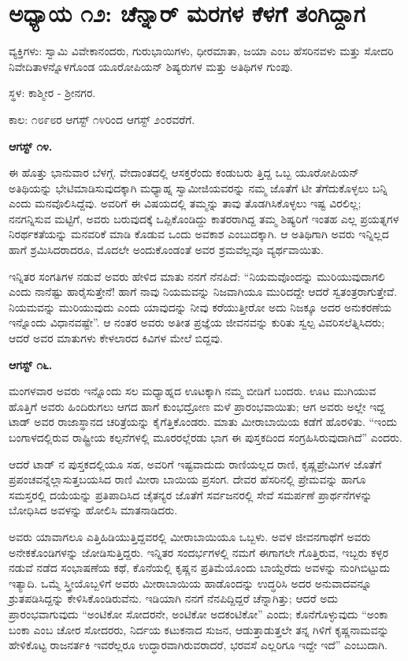 
\chapter{ಅಧ್ಯಾಯ ೧೨: ಚೆನ್ನಾರ್ ಮರಗಳ ಕೆಳಗೆ ತಂಗಿದ್ದಾಗ}

ವ್ಯಕ್ತಿಗಳು: ಸ್ವಾಮಿ ವಿವೇಕಾನಂದರು, ಗುರುಭಾಯಿಗಳು, ಧೀರಮಾತಾ, ಜಯಾ ಎಂಬ ಹೆಸರಿನವಳು ಮತ್ತು ಸೋದರಿ ನಿವೇದಿತಾಳನ್ನೊಳಗೊಂಡ ಯೂರೋಪಿಯನ್ ಶಿಷ್ಯರುಗಳ ಮತ್ತು ಅತಿಥಿಗಳ ಗುಂಪು.

ಸ್ಥಳ: ಕಾಶ್ಮೀರ - ಶ‍್ರೀನಗರ.

ಕಾಲ: ೧೮೯೮ರ ಆಗಸ್ಟ್ ೧೪ರಿಂದ ಆಗಸ್ಟ್ ೨೦ರವರೆಗೆ.

\textbf{ಆಗಸ್ಟ್ ೧೪.}

ಈ ಹೊತ್ತು ಭಾನುವಾರ ಬೆಳಗ್ಗೆ. ವೇದಾಂತದಲ್ಲಿ ಆಸಕ್ತರೆಂದು ಕಂಡುಬರು ತ್ತಿದ್ದ ಒಬ್ಬ ಯೂರೋಪಿಯನ್ ಅತಿಥಿಯನ್ನು ಭೇಟಿಮಾಡಿಸುವುದಕ್ಕಾಗಿ ಮಧ್ಯಾಹ್ನ ಸ್ವಾಮೀಜಿಯವರನ್ನು ನಮ್ಮ ಜೊತೆಗೆ ಟೀ ತೆಗೆದುಕೊಳ್ಳಲು ಬನ್ನಿ ಎಂದು ಮನವೊಲಿಸಿದ್ದೆವು. ಅವರಿಗೆ ಈ ವಿಷಯದಲ್ಲಿ ತಮ್ಮನ್ನು ತಾವು ತೊಡಗಿಸಿಕೊಳ್ಳಲು ಇಷ್ಟ ವಿರಲಿಲ್ಲ; ನನಗನ್ನಿಸುವ ಮಟ್ಟಿಗೆ, ಅವರು ಬರುವುದಕ್ಕೆ ಒಪ್ಪಿಕೊಂಡಿದ್ದು ಕಾತರರಾಗಿದ್ದ ತಮ್ಮ ಶಿಷ್ಯರಿಗೆ ಇಂತಹ ಎಲ್ಲ ಪ್ರಯತ್ನಗಳ ನಿರರ್ಥಕತೆಯನ್ನು ಮನವರಿಕೆ ಮಾಡಿ ಕೊಡುವ ಒಂದು ಅವಕಾಶ ಎಂಬುದಕ್ಕಾಗಿ. ಆ ಅತಿಥಿಗಾಗಿ ಅವರು ಇನ್ನಿಲ್ಲದ ಹಾಗೆ ಶ್ರಮಿಸಿದರಾದರೂ, ಮೊದಲೇ ಅಂದುಕೊಂಡಂತೆ ಅವರ ಶ್ರಮವೆಲ್ಲವೂ ವ್ಯರ್ಥವಾಯಿತು.

ಇನ್ನಿತರ ಸಂಗತಿಗಳ ನಡುವೆ ಅವರು ಹೇಳಿದ ಮಾತು ನನಗೆ ನೆನಪಿದೆ: “ನಿಯಮವೊಂದನ್ನು ಮುರಿಯುವುದಾಗಲಿ ಎಂದು ನಾನೆಷ್ಟು ಹಾರೈಸುತ್ತೇನೆ! ಹಾಗೆ ನಾವು ನಿಯಮವನ್ನು ನಿಜವಾಗಿಯೂ ಮುರಿದದ್ದೇ ಆದರೆ ಸ್ವತಂತ್ರರಾಗುತ್ತೇವೆ. ನಿಯಮವನ್ನು ಮುರಿಯುವುದು ಎಂದು ಯಾವುದನ್ನು ನೀವು ಕರೆಯುತ್ತೀರೋ ಅದು ನಿಜಕ್ಕೂ ಅದರ ಅನುಕರಣೆಯ ಇನ್ನೊಂದು ವಿಧಾನವಷ್ಟೇ”. ಆ ನಂತರ ಅವರು ಅತೀತ ಪ್ರಜ್ಞೆಯ ಜೀವನವನ್ನು ಕುರಿತು ಸ್ವಲ್ಪ ವಿವರಿಸಲೆತ್ನಿಸಿದರು; ಆದರೆ ಅವರ ಮಾತುಗಳು ಕೇಳಲಾರದ ಕಿವಿಗಳ ಮೇಲೆ ಬಿದ್ದವು.

\textbf{ಆಗಸ್ಟ್ ೧೬.}

ಮಂಗಳವಾರ ಅವರು ಇನ್ನೊಂದು ಸಲ ಮಧ್ಯಾಹ್ನದ ಊಟಕ್ಕಾಗಿ ನಮ್ಮ ಬೀಡಿಗೆ ಬಂದರು. ಊಟ ಮುಗಿಯುವ ಹೊತ್ತಿಗೆ ಅವರು ಹಿಂದಿರುಗಲು ಆಗದ ಹಾಗೆ ಕುಂಭದ್ರೋಣ ಮಳೆ ಪ್ರಾರಂಭವಾಯಿತು; ಆಗ ಅವರು ಅಲ್ಲೇ ಇದ್ದ ಟಾಡ್ ಅವರ ರಾಜಾಸ್ಥಾನದ ಚರಿತ್ರೆಯನ್ನು ಕೈಗೆತ್ತಿಕೊಂಡರು. ಮಾತು ಮೀರಾಬಾಯಿಯ ಕಡೆಗೆ ಹೊರಳಿತು. “ಇಂದು ಬಂಗಾಳದಲ್ಲಿರುವ ರಾಷ್ಟ್ರೀಯ ಕಲ್ಪನೆಗಳಲ್ಲಿ ಮೂರರಲ್ಲೆರಡು ಭಾಗ ಈ ಪುಸ್ತಕದಿಂದ ಸಂಗ್ರಹಿಸಿರುವುದಾಗಿದೆ” ಎಂದರು.

ಆದರೆ ಟಾಡ್ ನ ಪುಸ್ತಕದಲ್ಲಿಯೂ ಸಹ, ಅವರಿಗೆ ಇಷ್ಟವಾದುದು ರಾಣಿಯಲ್ಲದ ರಾಣಿ, ಕೃಷ್ಣಪ್ರೇಮಿಗಳ ಜೊತೆಗೆ ಪ್ರಪಂಚವನ್ನೆಲ್ಲಾಸುತ್ತಬಯಸಿದ ರಾಣಿ ಮೀರಾ ಬಾಯಿಯ ಪ್ರಸಂಗ. ದೇವರ ಹೆಸರಿನಲ್ಲಿ ಪ್ರೇಮವನ್ನು ಹಾಗೂ ಸಮಸ್ತರಲ್ಲಿ ದಯೆಯನ್ನು ಪ್ರತಿಪಾದಿಸಿದ ಚೈತನ್ಯರ ಜೊತೆಗೆ ಸರ್ವಜನರಲ್ಲಿ ಸೇವೆ ಸಮರ್ಪಣೆ ಪ್ರಾರ್ಥನೆಗಳನ್ನು ಬೋಧಿಸಿದ ಅವಳನ್ನು ಹೋಲಿಸಿ ಮಾತನಾಡಿದರು.

ಅವರು ಯಾವಾಗಲೂ ಎತ್ತಿಹಿಡಿಯುತ್ತಿದ್ದವರಲ್ಲಿ ಮೀರಾಬಾಯಿಯೂ ಒಬ್ಬಳು. ಅವಳ ಜೀವನಗಾಥೆಗೆ ಅವರು ಅನೇಕಕೊಂಡಿಗಳನ್ನು ಜೋಡಿಸುತ್ತಿದ್ದರು. ಇನ್ನಿತರ ಸಂದರ್ಭಗಳಲ್ಲಿ ನಮಗೆ ಈಗಾಗಲೇ ಗೊತ್ತಿರುವ, ಇಬ್ಬರು ಕಳ್ಳರ ನಡುವೆ ನಡೆದ ಸಂಭಾಷಣೆಯ ಕಥೆ, ಕೊನೆಯಲ್ಲಿ ಕೃಷ್ಣನ ಪ್ರತಿಮೆಯೊಂದು ಬಾಯ್ದೆರೆದು ಅವಳನ್ನು ನುಂಗಿಬಿಟ್ಟುದು ಇತ್ಯಾದಿ. ಒಮ್ಮೆ ಸ್ತ್ರೀಯೊಬ್ಬಳಿಗೆ ಅವರು ಮೀರಾಬಾಯಿಯ ಹಾಡೊಂದನ್ನು ಉದ್ಧರಿಸಿ ಅದರ ಅನುವಾದವನ್ನೂ ಶ್ರುತಪಡಿಸಿದ್ದನ್ನು ಕೇಳಿಸಿಕೊಂಡಿರುವೆನು. ಇಡಿಯಾಗಿ ನನಗೆ ನೆನಪಿದ್ದಿದ್ದರೆ ಚೆನ್ನಾಗಿತ್ತು; ಆದರೆ ಅದು ಪ್ರಾರಂಭವಾಗುವುದು “ಅಂಟಿಕೋ ಸೋದರನೇ, ಅಂಟಿಕೋ ಅದಕಂಟಿಕೋ” ಎಂದು; ಕೊನೆಗೊಳ್ಳುವುದು “ಅಂಕಾ ಬಂಕಾ ಎಂಬ ಚೋರ ಸೋದರರು, ನಿರ್ದಯ ಕಟುಕನಾದ ಸುಜನ, ಆಡುತ್ತಾಡುತ್ತಲೇ ತನ್ನ ಗಿಳಿಗೆ ಕೃಷ್ಣನಾಮವನ್ನು ಹೇಳಿಕೊಟ್ಟ ರಾಜನರ್ತಕಿ ಇವರೆಲ್ಲರೂ ಉದ್ಧಾರವಾಗಿರುವರಾದರೆ, ಭರವಸೆ ಎಲ್ಲರಿಗೂ ಇದ್ದೇ ಇದೆ” ಎಂಬುದಾಗಿ.

